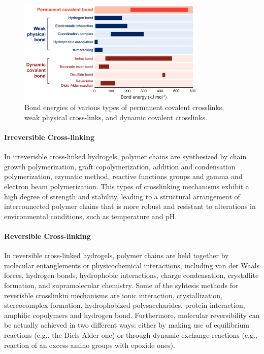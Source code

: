 \begin{figure}[!ht]
    \centering
    \includegraphics[width=0.8\textwidth]{figs/bonds_energy.png}
    \caption{Bond energies of various types of permanent covalent crosslinks, weak physical cross-links, and dynamic covalent crosslinks.}
\end{figure}

\paragraph{Irreversible Cross-linking}
In irreverisble cross-linked hydrogels, polymer chains are synthesized by chain growth polymerization, graft copolymerization, addition and condensation polymerization, ezymatic method, reactive functions groups and gamma and electron beam polymerization\citep{maitraCrosslinkingHydrogelsReview2014,bustamantetorresHydrogelsClassificationAccording2021}.
This types of crosslinking mechanisms exhibit a high degree of strength and stability, leading to a structural arrangement of interconnected polymer chains that is more robust and resistant to alterations in environmental conditions, such as temperature and pH\citep{maitraCrosslinkingHydrogelsReview2014}.


\paragraph{Reversible Cross-linking}
In reversible cross-linked hydrogels, polymer chains are held together by molecular entanglements or physicochemical interactions, including van der Waals forces, hydrogen bonds, hydrophobic interactions, charge condensation, crystallite formation, and supramolecular chemistry\citep{bustamantetorresHydrogelsClassificationAccording2021,maitraCrosslinkingHydrogelsReview2014}.
Some of the syhtesis methods for reverisble crosslinkin mechanisms are ionic interaction, crystallization, stereocomplex formation, hydrophobized polysaccharides, protein interaction, amphilic copolymers and hydrogen bond\citep{maitraCrosslinkingHydrogelsReview2014,bustamantetorresHydrogelsClassificationAccording2021}.
Furthermore, molecular reversibility can be actually achieved in two different ways: either by making use of equilibrium reactions (e.g., the Diels-Alder one) or through dynamic exchange reactions (e.g., reaction of an excess amino groups with epoxide ones)\citep{picchioniHydrogelsBasedDynamic2018}. 


